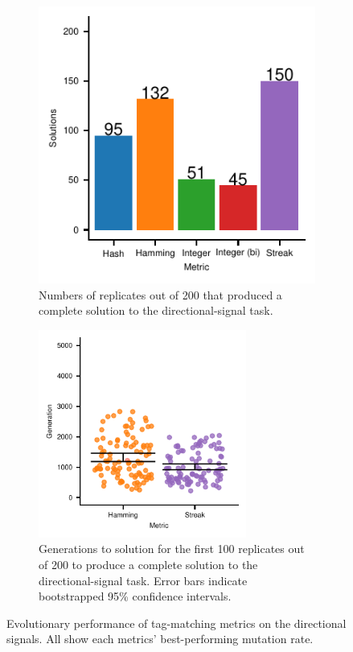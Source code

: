 \begin{figure}[!htbp]

\begin{subfigure}[b]{\linewidth}
\centering
\includegraphics[width=0.75\linewidth]{img/gp_results/panel-dst-sols.pdf}%
\caption{
Numbers of replicates out of 200 that produced a complete solution to the directional-signal task.}
\label{fig:dst-sols}
\end{subfigure}
\begin{subfigure}[b]{\linewidth}
\centering
\includegraphics[width=0.75\textwidth]{img/gp_results/panel-dst-times.pdf}%
\caption{
Generations to solution for the first 100 replicates out of 200 to produce a complete solution to the directional-signal task.
Error bars indicate bootstrapped 95\% confidence intervals.
}
\label{fig:dst-times}
\end{subfigure}

\label{fig:gp_results}

\caption{
Evolutionary performance of tag-matching metrics on the directional signals.
All show each metrics' best-performing mutation rate.
}

\label{fig:evo_directional_signal}
\end{figure}
